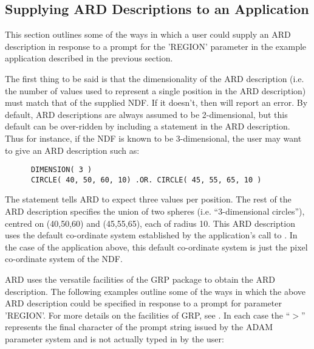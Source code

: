 \subsection{Supplying ARD Descriptions to an Application}
This section outlines some of the ways in which a user could supply an ARD
description in response to a prompt for the 'REGION' parameter in the example
application described in the previous section. 

The first thing to be said is that the dimensionality of the ARD description
(i.e. the number of values used to represent a single position in the ARD
description) must match that of the supplied NDF. If it
doesn't, then  will report an error. By default, ARD descriptions are
always assumed to be 2-dimensional, but this default can be over-ridden by
including a  statement in the ARD description. Thus for instance, if 
the NDF is known to be 3-dimensional, the user may want to give an ARD 
description such as:

\small
\begin{verbatim}
      DIMENSION( 3 )
      CIRCLE( 40, 50, 60, 10) .OR. CIRCLE( 45, 55, 65, 10 ) 
\end{verbatim}
\normalsize

The  statement tells ARD to expect three values per position. The rest
of the ARD description specifies the union of two spheres (i.e. ``3-dimensional
circles''), centred on (40,50,60) and (45,55,65), each of radius 10. This ARD
description uses the default co-ordinate system established by the application's
call to . In the case of the application above, this default
co-ordinate system is just the pixel co-ordinate system of the NDF. 

ARD uses the versatile facilities of the GRP package to obtain the ARD
description. The following examples outline some of the ways in which the above
ARD description could be specified in response to a prompt for parameter
'REGION'. For more details on the facilities of GRP, see . In each case
the ``$>$'' represents the final character of the prompt string issued by the
ADAM parameter system and is not actually typed in by the user: 

